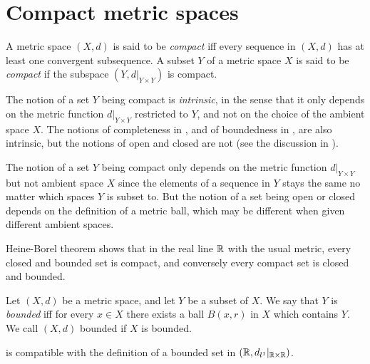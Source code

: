 \section{Compact metric spaces}\label{ii:sec:1.5}

\begin{defn}[Compactness]\label{ii:1.5.1}
  A metric space \((X, d)\) is said to be \emph{compact} iff every sequence in \((X, d)\) has at least one convergent subsequence.
  A subset \(Y\) of a metric space \(X\) is said to be \emph{compact} if the subspace \((Y, d|_{Y \times Y})\) is compact.
\end{defn}

\begin{rmk}\label{ii:1.5.2}
  The notion of a set \(Y\) being compact is \emph{intrinsic}, in the sense that it only depends on the metric function \(d|_{Y \times Y}\) restricted to \(Y\), and not on the choice of the ambient space \(X\).
  The notions of completeness in , and of boundedness in , are also intrinsic, but the notions of open and closed are not
  (see the discussion in ).
\end{rmk}

\begin{note}
  The notion of a set \(Y\) being compact only depends on the metric function \(d|_{Y \times Y}\) but not ambient space \(X\) since the elements of a sequence in \(Y\) stays the same no matter which spaces \(Y\) is subset to.
  But the notion of a set being open or closed depends on the definition of a metric ball, which may be different when given different ambient spaces.
\end{note}

\begin{note}
  Heine-Borel theorem shows that in the real line \(\mathbb{R}\) with the usual metric, every closed and bounded set is compact, and conversely every compact set is closed and bounded.
\end{note}

\begin{defn}\label{ii:1.5.3}
  Let \((X, d)\) be a metric space, and let \(Y\) be a subset of \(X\).
  We say that \(Y\) is \emph{bounded} iff for every \(x \in X\) there exists a ball \(B(x, r)\) in \(X\) which contains \(Y\).
  We call \((X, d)\) bounded if \(X\) is bounded.
\end{defn}

\begin{rmk}\label{ii:1.5.4}
   is compatible with the definition of a bounded set in \((\mathbb{R}, d_{l^1}|_{\mathbb{R} \times \mathbb{R}})\).
\end{rmk}

